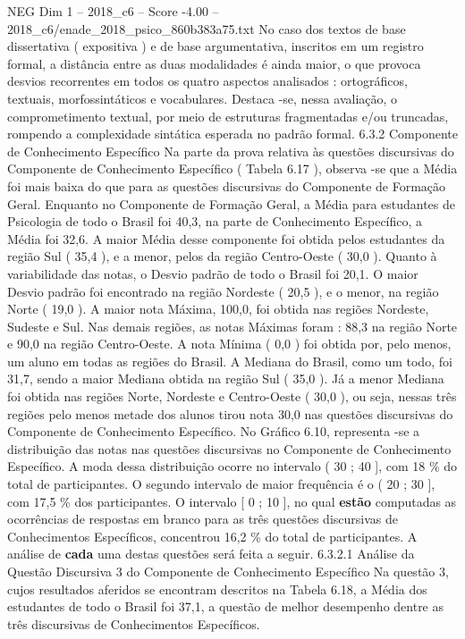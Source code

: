 \begin{textsample}{NEG Dim 1 – 2018\_c6 – Score -4.00 – 2018\_c6/enade\_2018\_psico\_860b383a75.txt}
No caso dos textos de base dissertativa ( expositiva ) e de base argumentativa, inscritos em um registro formal, a distância entre as duas modalidades é ainda maior, o que provoca desvios recorrentes em todos os quatro aspectos analisados : ortográficos, textuais, morfossintáticos e vocabulares.
Destaca -se, nessa avaliação, o comprometimento textual, por meio de estruturas fragmentadas e/ou truncadas, rompendo a complexidade sintática esperada no padrão formal. 6.3.2 Componente de Conhecimento Específico Na parte da prova relativa às questões discursivas do Componente de Conhecimento Específico ( Tabela 6.17 ), observa -se que a Média foi mais baixa do que para as questões discursivas do Componente de Formação Geral.
Enquanto no Componente de Formação Geral, a Média para estudantes de Psicologia de todo o Brasil foi 40,3, na parte de Conhecimento Específico, a Média foi 32,6.
A maior Média desse componente foi obtida pelos estudantes da região Sul ( 35,4 ), e a menor, pelos da região Centro-Oeste ( 30,0 ).
Quanto à variabilidade das notas, o Desvio padrão de todo o Brasil foi 20,1.
O maior Desvio padrão foi encontrado na região Nordeste ( 20,5 ), e o menor, na região Norte ( 19,0 ).
A maior nota Máxima, 100,0, foi obtida nas regiões Nordeste, Sudeste e Sul.
Nas demais regiões, as notas Máximas foram : 88,3 na região Norte e 90,0 na região Centro-Oeste.
A nota Mínima ( 0,0 ) foi obtida por, pelo menos, um aluno em todas as regiões do Brasil.
A Mediana do Brasil, como um todo, foi 31,7, sendo a maior Mediana obtida na região Sul ( 35,0 ).
Já a menor Mediana foi obtida nas regiões Norte, Nordeste e Centro-Oeste ( 30,0 ), ou seja, nessas três regiões pelo menos metade dos alunos tirou nota 30,0 nas questões discursivas do Componente de Conhecimento Específico.
No Gráfico 6.10, representa -se a distribuição das notas nas questões discursivas no Componente de Conhecimento Específico.
A moda dessa distribuição ocorre no intervalo ( 30 ; 40 ], com 18 \% do total de participantes.
O segundo intervalo de maior frequência é o ( 20 ; 30 ], com 17,5 \% dos participantes.
O intervalo [ 0 ; 10 ], no qual \textbf{estão} computadas as ocorrências de respostas em branco para as três questões discursivas de Conhecimentos Específicos, concentrou 16,2 \% do total de participantes.
A análise de \textbf{cada} uma destas questões será feita a seguir. 6.3.2.1 Análise da Questão Discursiva 3 do Componente de Conhecimento Específico Na questão 3, cujos resultados aferidos se encontram descritos na Tabela 6.18, a Média dos estudantes de todo o Brasil foi 37,1, a questão de melhor desempenho dentre as três discursivas de Conhecimentos Específicos.

\end{textsample}
